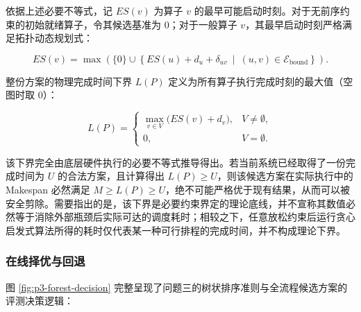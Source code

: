 \documentclass[anonymous,withtoc]{gmcm2026}
\begin{document}
依据上述必要不等式，记 \(ES(v)\) 为算子 \(v\) 的最早可能启动时刻。对于无前序约束的初始就绪算子，令其候选基准为 0；对于一般算子 \(v\)，其最早启动时刻严格满足拓扑动态规划式：

\begin{equation}
ES(v) = \max \left( \{0\} \cup \left\{ ES(u) + d_u + \delta_{uv} \ \middle|\ (u, v) \in \mathcal{E}_{\mathrm{bound}} \right\} \right).
\end{equation}

整份方案的物理完成时间下界 \(L(P)\) 定义为所有算子执行完成时刻的最大值（空图时取 0）：

\begin{equation}
L(P) = \begin{cases} \displaystyle \max_{v \in V} \bigl( ES(v) + d_v \bigr), & V \ne \emptyset, \\ 0, & V = \emptyset. \end{cases}
\end{equation}

该下界完全由底层硬件执行的必要不等式推导得出。若当前系统已经取得了一份完成时间为 \(U\) 的合法方案，且计算得出 \(L(P) \ge U\)，则该候选方案在实际执行中的 Makespan 必然满足 \(M \ge L(P) \ge U\)，绝不可能严格优于现有结果，从而可以被安全剪除。需要指出的是，该下界是必要约束界定的理论底线，并不宣称其数值必然等于消除外部瓶颈后实际可达的调度耗时；相较之下，任意放松约束后运行贪心启发式算法所得的耗时仅代表某一种可行排程的完成时间，并不构成理论下界。

\subsubsection{在线择优与回退}

图 \ref{fig:p3-forest-decision} 完整呈现了问题三的树状排序准则与全流程候选方案的评测决策逻辑：
\end{document}
